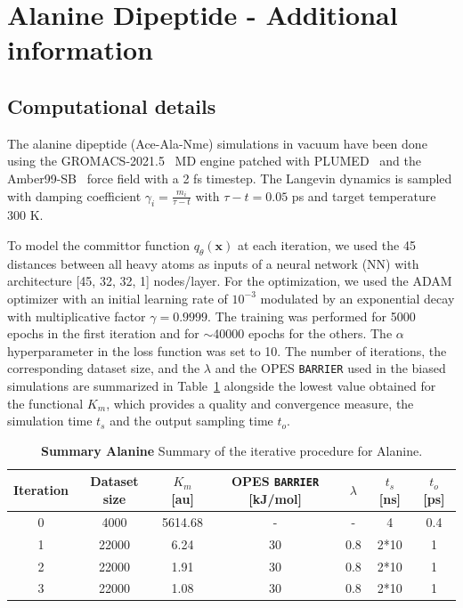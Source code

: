 \clearpage
\section{Alanine Dipeptide - Additional information}
    \subsection{Computational details}
            The alanine dipeptide (Ace-Ala-Nme) simulations in vacuum have been done using the GROMACS-2021.5~\cite{abraham2015gromacs} MD engine patched with PLUMED~\cite{tribello2014plumed, plumed2019promoting} and the Amber99-SB~\cite{amber2013} force field with a 2 fs timestep. 
            The Langevin dynamics is sampled with damping coefficient $\gamma_i= \frac {m_i}{\tau-t}$ with $\tau-t = 0.05$ ps and target temperature 300 K.

        To model the committor function $q_\theta(\textbf{x})$ at each iteration, we used the 45 distances between all heavy atoms as inputs of a neural network (NN) with architecture  [45, 32, 32, 1] nodes/layer. 
        For the optimization, we used the ADAM optimizer with an initial learning rate of $10^{-3}$ modulated by an exponential decay with multiplicative factor $\gamma=0.9999$. 
        The training was performed for 5000 epochs in the first iteration and for $\sim$40000 epochs for the others. 
        The $\alpha$ hyperparameter in the loss function was set to 10. 
        The number of iterations, the corresponding dataset size, and the $\lambda$ and the OPES \texttt{BARRIER} used in the biased simulations are summarized in Table~\ref{sup_tab:alanine_iterations} alongside the lowest value obtained for the functional $K_m$, which provides a quality and convergence measure, the simulation time $t_s$ and the output sampling time $t_o$.
            \begin {table}[h!]
                \caption {\textbf{Summary Alanine} Summary of the iterative procedure for Alanine.} \label{sup_tab:alanine_iterations}
                \begin{center}
                \begin{tabular}{ |c|c|c|c|c|c|c| } 
                 \hline
                 Iteration & Dataset size & $K_m$ [au] & OPES \texttt{BARRIER} [kJ/mol] & $\lambda$ & $t_s$ [ns] & $t_o$ [ps] \\ 
                 \hline
                    0   & 4000 & 5614.68 & - & -   & 4 & 0.4 \\
                    1   & 22000 & 6.24  & 30 & 0.8 & 2*10 & 1 \\
                    2   & 22000 & 1.91 & 30 & 0.8 & 2*10 & 1 \\ 
                    3   & 22000 & 1.08 & 30 & 0.8 & 2*10 & 1 \\  
                 \hline
                \end{tabular}
                \end{center}
            \end {table}

